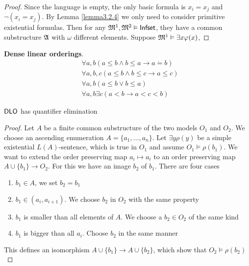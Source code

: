 \documentclass[11pt]{article}
\begin{document}
\begin{proof}
Since the language is empty, the only basic formula is \(x_i=x_j\) and
\(\neg(x_i=x_j)\). By Lemma \ref{lemma3.2.4} we only need to consider primitive
existential formulas. Then for any \(\mathfrak{M}^1,\mathfrak{M}^2\vDash\operatorname{\textsf{Infset}}\), they have a common substructure \(\mathfrak{A}\) with
\(\omega\) different elements. Suppose \(\mathfrak{M}^1\vDash\exists x\varphi(x)\),
\end{proof}

\textbf{Dense linear orderings}.
\begin{align*}
&\forall a,b(a\le b\wedge b\le a\to a\dot{=}b)\\
&\forall a,b,c(a\le b\wedge b\le c\to a\le c)\\
&\forall a,b(a\le b\vee b\le a)\\
&\forall a,b\exists c(a< b\to a< c< b)
\end{align*}
\begin{theorem}[]
\(\operatorname{\textsf{DLO}}\) has quantifier elimination
\end{theorem}

\begin{proof}
Let \(A\) be a finite common substructure of the two models \(O_1\) and
\(O_2\). We choose an ascending enumeration \(A=\{a_1,\dots,a_n\}\). Let
\(\exists y\rho (y)\) be a simple existential \(L(A)\)-sentence, which is
true in \(O_1\) and assume \(O_1\vDash\rho(b_1)\). We want to extend the
order preserving map \(a_i\mapsto a_i\) to an order preserving map
\(A\cup\{b_1\}\to O_2\). For this we have an image \(b_2\) of \(b_1\). There
are four cases
\begin{enumerate}
\item \(b_1\in A\), we set \(b_2=b_1\)
\item \(b_1\in(a_i,a_{i+1})\). We choose \(b_2\) in \(O_2\) with the same property
\item \(b_1\) is smaller than all elements of \(A\). We choose a \(b_2\in O_2\)
of the same kind
\item \(b_1\) is bigger than all \(a_i\). Choose \(b_2\) in the same manner
\end{enumerate}


This defines an isomorphism \(A\cup\{b_1\}\to A\cup\{b_2\}\), which show that \(O_2\vDash\rho(b_2)\)
\end{proof}
\end{document}
